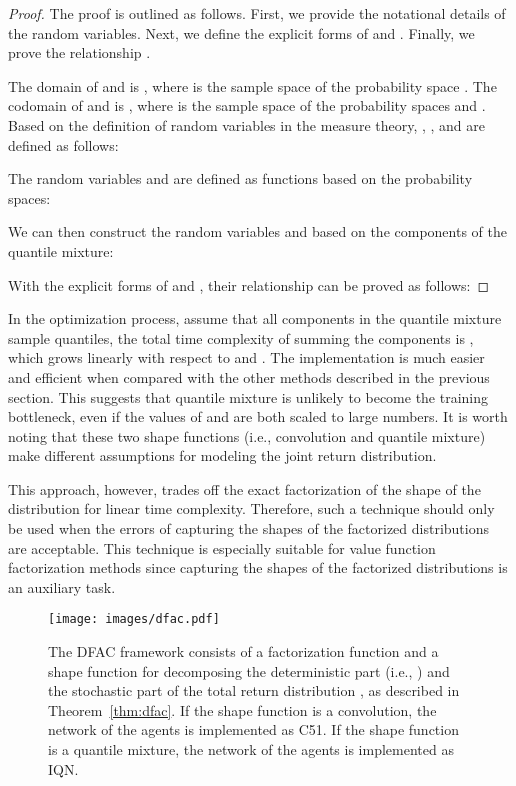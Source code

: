 \documentclass[twoside,11pt]{article}
\newcounter{definition0}
\begin{document}
\begin{proof}
The proof is outlined as follows. First, we provide the notational details of the random variables. Next, we define the explicit forms of  and . Finally, we prove the relationship .

The domain of  and  is , where  is the sample space of the probability space .
The codomain of  and  is , where  is the sample space of the probability spaces  and .
Based on the definition of random variables in the measure theory, , , and  are defined as follows:

The random variables  and  are defined as functions based on the probability spaces:

We can then construct the random variables  and  based on the components of the quantile mixture:


With the explicit forms of  and , their relationship can be proved as follows:

\end{proof} In the optimization process, assume that all components  in the quantile mixture sample  quantiles, the total time complexity of summing the components is , which grows linearly with respect to  and . The implementation is much easier and efficient when compared with the other methods described in the previous section. This suggests that quantile mixture is unlikely to become the training bottleneck, even if the values of  and  are both scaled to large numbers. It is worth noting that these two shape functions (i.e., convolution and quantile mixture) make different assumptions for modeling the joint return distribution.

This approach, however, trades off the exact factorization of the shape of the distribution for linear time complexity. Therefore, such a technique should only be used when the errors of capturing the shapes of the factorized distributions are acceptable. This technique is especially suitable for value function factorization methods since capturing the shapes of the factorized distributions is an auxiliary task.

\begin{figure*}[t]
\texttt{[image: images/dfac.pdf]}
\caption{The DFAC framework consists of a factorization function  and a shape function  for decomposing the deterministic part  (i.e., ) and the stochastic part  of the total return distribution , as described in Theorem~\ref{thm:dfac}. If the shape function is a convolution, the network of the agents is implemented as C51. If the shape function is a quantile mixture, the network of the agents is implemented as IQN.
}
\label{fig:dfac}
\end{figure*}
 
\end{document}
